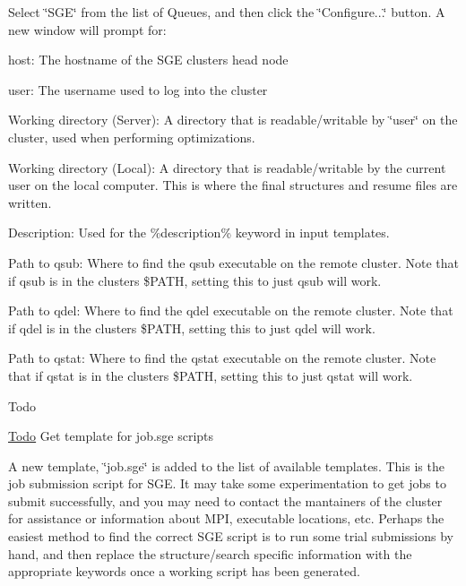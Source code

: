 Select \char`\"{}\+S\+G\+E\char`\"{} from the list of Queues, and then click the \char`\"{}\+Configure...\char`\"{} button. A new window will prompt for\+:
\begin{DoxyItemize}
\item host\+: The hostname of the S\+G\+E cluster\textquotesingle{}s head node
\item user\+: The username used to log into the cluster
\item Working directory (Server)\+: A directory that is readable/writable by \char`\"{}user\char`\"{} on the cluster, used when performing optimizations.
\item Working directory (Local)\+: A directory that is readable/writable by the current user on the local computer. This is where the final structures and resume files are written.
\item Description\+: Used for the \%description\% keyword in input templates.
\item Path to qsub\+: Where to find the qsub executable on the remote cluster. Note that if qsub is in the cluster\textquotesingle{}s \$\+P\+A\+T\+H, setting this to just \textquotesingle{}qsub\textquotesingle{} will work.
\item Path to qdel\+: Where to find the qdel executable on the remote cluster. Note that if qdel is in the cluster\textquotesingle{}s \$\+P\+A\+T\+H, setting this to just \textquotesingle{}qdel\textquotesingle{} will work.
\item Path to qstat\+: Where to find the qstat executable on the remote cluster. Note that if qstat is in the cluster\textquotesingle{}s \$\+P\+A\+T\+H, setting this to just \textquotesingle{}qstat\textquotesingle{} will work.
\end{DoxyItemize}

\begin{DoxyRefDesc}{Todo}
\item[\hyperlink{todo__todo000002}{Todo}]Get template for job.\+sge scripts\end{DoxyRefDesc}


A new template, \char`\"{}job.\+sge\char`\"{} is added to the list of available templates. This is the job submission script for S\+G\+E. It may take some experimentation to get jobs to submit successfully, and you may need to contact the mantainers of the cluster for assistance or information about M\+P\+I, executable locations, etc. Perhaps the easiest method to find the correct S\+G\+E script is to run some trial submissions by hand, and then replace the structure/search specific information with the appropriate keywords once a working script has been generated.


